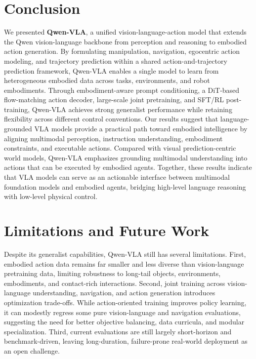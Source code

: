 \documentclass{llmxive}
\begin{document}
\section{Conclusion}


We presented \textbf{Qwen-VLA}, a unified vision-language-action model that extends the Qwen vision-language backbone from perception and reasoning to embodied action generation. By formulating manipulation, navigation, egocentric action modeling, and trajectory prediction within a shared action-and-trajectory prediction framework, Qwen-VLA enables a single model to learn from heterogeneous embodied data across tasks, environments, and robot embodiments. Through embodiment-aware prompt conditioning, a DiT-based flow-matching action decoder, large-scale joint pretraining, and SFT/RL post-training, Qwen-VLA achieves strong generalist performance while retaining flexibility across different control conventions. Our results suggest that language-grounded VLA models provide a practical path toward embodied intelligence by aligning multimodal perception, instruction understanding, embodiment constraints, and executable actions. Compared with visual prediction-centric world models, Qwen-VLA emphasizes grounding multimodal understanding into actions that can be executed by embodied agents. Together, these results indicate that VLA models can serve as an actionable interface between multimodal foundation models and embodied agents, bridging high-level language reasoning with low-level physical control.


\section{Limitations and Future Work}

Despite its generalist capabilities, Qwen-VLA still has several limitations. First, embodied action data remains far smaller and less diverse than vision-language pretraining data, limiting robustness to long-tail objects, environments, embodiments, and contact-rich interactions. Second, joint training across vision-language understanding, navigation, and action generation introduces optimization trade-offs. While action-oriented training improves policy learning, it can modestly regress some pure vision-language and navigation evaluations, suggesting the need for better objective balancing, data curricula, and modular specialization. Third, current evaluations are still largely short-horizon and benchmark-driven, leaving long-duration, failure-prone real-world deployment as an open challenge.
\end{document}
